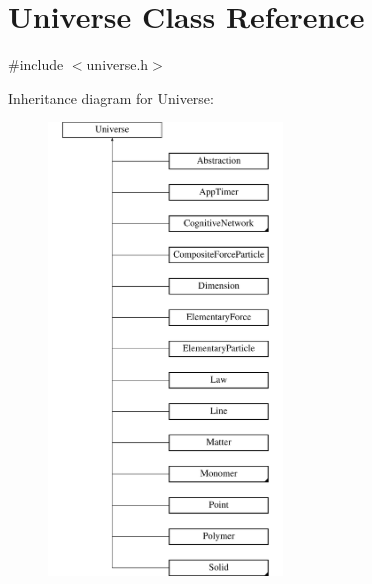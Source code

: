 \hypertarget{classUniverse}{}\section{Universe Class Reference}
\label{classUniverse}


{\ttfamily \#include $<$universe.\+h$>$}

Inheritance diagram for Universe\+:\begin{figure}[H]
\begin{center}
\leavevmode
\includegraphics[height=12.000000cm]{classUniverse}
\end{center}
\end{figure}
